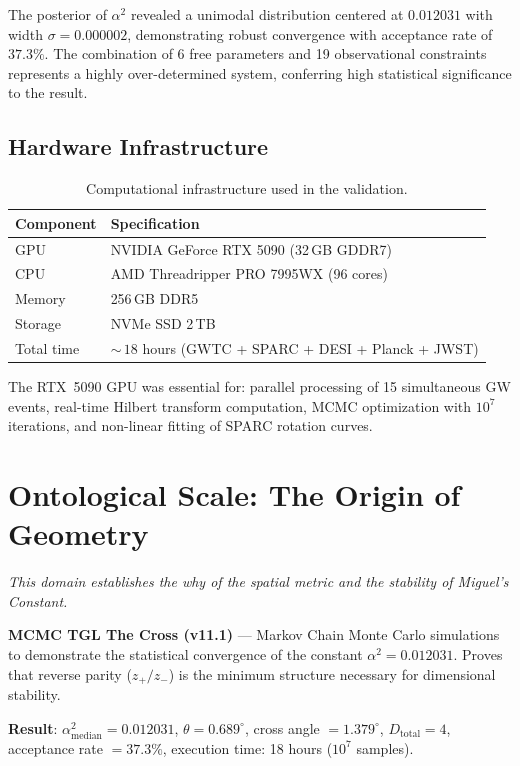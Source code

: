 \documentclass[12pt,a4paper,twoside]{article}
\newcommand{\alphaii}{\alpha^{2}}
\newcommand{\code}[1]{\texttt{#1}}
\begin{document}
The posterior of $\alphaii$ revealed a unimodal distribution centered at $0.012031$ with width $\sigma = 0.000002$, demonstrating robust convergence with acceptance rate of $37.3\%$. The combination of 6 free parameters and 19 observational constraints represents a highly over-determined system, conferring high statistical significance to the result.

\subsection{Hardware Infrastructure}

\begin{table}[H]
\centering
\caption{Computational infrastructure used in the validation.}
\label{tab:hardware}
\begin{tabular}{ll}
\toprule
\textbf{Component} & \textbf{Specification} \\
\midrule
GPU & NVIDIA GeForce RTX 5090 (32\,GB GDDR7) \\
CPU & AMD Threadripper PRO 7995WX (96 cores) \\
Memory & 256\,GB DDR5 \\
Storage & NVMe SSD 2\,TB \\
Total time & ${\sim}\,18$ hours (GWTC + SPARC + DESI + Planck + JWST) \\
\bottomrule
\end{tabular}
\end{table}

\noindent The RTX~5090 GPU was essential for: parallel processing of 15 simultaneous GW events, real-time Hilbert transform computation, MCMC optimization with $10^7$ iterations, and non-linear fitting of SPARC rotation curves.


\section{Ontological Scale: The Origin of Geometry}


\noindent\textit{This domain establishes the why of the spatial metric and the stability of Miguel's Constant.}

\begin{codebox}[title={Protocol \#1 --- \code{TGL\_v11\_1\_CRUZ.py} (1,684 lines)}]
\textbf{MCMC TGL The Cross (v11.1)} --- Markov Chain Monte Carlo simulations to demonstrate the statistical convergence of the constant $\alphaii = 0.012031$. Proves that reverse parity ($z_+/z_-$) is the minimum structure necessary for dimensional stability.

\medskip
\textbf{Result}: $\alphaii_{\text{median}} = 0.012031$, $\theta = 0.689^\circ{}$, cross angle $= 1.379^\circ{}$, $D_{\text{total}} = 4$, acceptance rate $= 37.3\%$, execution time: 18 hours ($10^7$ samples).
\end{codebox}
\end{document}
